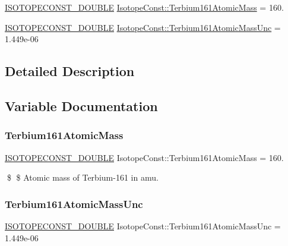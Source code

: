 \begin{DoxyCompactItemize}
\item 
\mbox{\hyperlink{group___isotope_const-_macros_ga8f45a7272ce02c0b4c65c44636ed719a}{I\+S\+O\+T\+O\+P\+E\+C\+O\+N\+S\+T\+\_\+\+D\+O\+U\+B\+LE}} \mbox{\hyperlink{group___isotope_const-_terbium-_tb161_gab70e216ddba942bc99e0acb40c352287}{Isotope\+Const\+::\+Terbium161\+Atomic\+Mass}} = 160.
\item 
\mbox{\hyperlink{group___isotope_const-_macros_ga8f45a7272ce02c0b4c65c44636ed719a}{I\+S\+O\+T\+O\+P\+E\+C\+O\+N\+S\+T\+\_\+\+D\+O\+U\+B\+LE}} \mbox{\hyperlink{group___isotope_const-_terbium-_tb161_gabee6c0506b465642fdc2e9de0bd500ab}{Isotope\+Const\+::\+Terbium161\+Atomic\+Mass\+Unc}} = 1.\+449e-\/06
\end{DoxyCompactItemize}


\subsection{Detailed Description}


\subsection{Variable Documentation}
\mbox{\label{group___isotope_const-_terbium-_tb161_gab70e216ddba942bc99e0acb40c352287}} 
\subsubsection{\texorpdfstring{Terbium161\+Atomic\+Mass}{Terbium161AtomicMass}}
{\footnotesize\ttfamily \mbox{\hyperlink{group___isotope_const-_macros_ga8f45a7272ce02c0b4c65c44636ed719a}{I\+S\+O\+T\+O\+P\+E\+C\+O\+N\+S\+T\+\_\+\+D\+O\+U\+B\+LE}} Isotope\+Const\+::\+Terbium161\+Atomic\+Mass = 160.}

\$ \$ Atomic mass of Terbium-\/161 in amu. \mbox{\label{group___isotope_const-_terbium-_tb161_gabee6c0506b465642fdc2e9de0bd500ab}} 
\subsubsection{\texorpdfstring{Terbium161\+Atomic\+Mass\+Unc}{Terbium161AtomicMassUnc}}
{\footnotesize\ttfamily \mbox{\hyperlink{group___isotope_const-_macros_ga8f45a7272ce02c0b4c65c44636ed719a}{I\+S\+O\+T\+O\+P\+E\+C\+O\+N\+S\+T\+\_\+\+D\+O\+U\+B\+LE}} Isotope\+Const\+::\+Terbium161\+Atomic\+Mass\+Unc = 1.\+449e-\/06}

